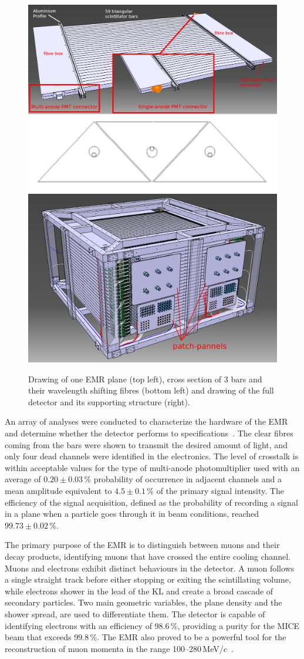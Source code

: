 \begin{figure}[htb!]
	\begin{center}
		\includegraphics[width=0.465\columnwidth]{EMR1.png}
		\hfill
		\includegraphics[width=0.515\columnwidth]{EMR2.jpg}
		\caption{Drawing of one EMR plane (top left), cross section of 3 bars and their wavelength shifting fibres (bottom left) and drawing of the full detector and its supporting structure (right).}
		\label{fig:EMR}
	\end{center}
\end{figure}

An array of analyses were conducted to characterize the hardware of the EMR and determine whether the detector performs to specifications~\cite{Drielsma:2017doj}. The clear fibres coming from the bars were shown to transmit the desired amount of light, and only four dead channels were identified in the electronics. The level of crosstalk is within acceptable values for the type of multi-anode photomultiplier used with an average of $0.20\pm0.03$\,\% probability of occurrence in adjacent channels and a mean amplitude equivalent to $4.5\pm0.1$\,\% of the primary signal intensity. The efficiency of the signal acquisition, defined as the probability of recording a signal in a plane when a particle goes through it in beam conditions, reached $99.73\pm0.02$\,\%.

The primary purpose of the EMR is to distinguish between muons and their decay products, identifying
muons that have crossed the entire cooling channel. Muons and electrons exhibit distinct behaviours in the detector. A muon follows a single straight track before either stopping or exiting the scintillating volume, while electrons shower in the lead of the KL and create a broad cascade of secondary particles. Two main geometric variables, the plane density and the shower spread, are used to differentiate them. The detector is capable of identifying electrons with an efficiency of 98.6\,\%, providing a purity for the MICE beam that exceeds 99.8\,\%. The EMR also proved to be a powerful tool for the reconstruction of muon momenta in the range 100--280\,MeV/$c$~\cite{2015JInst..10P2012A}.

